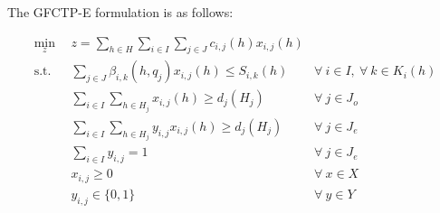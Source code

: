 
The GFCTP-E formulation is as follows:

\begin{subequations}\label{eqs:GFCTP-E}
  \begin{align}
    \min_{z} \:\: & 
    z = \sum_{h \in H}\sum_{i \in I}\sum_{j \in J}c_{i,j}(h) x_{i,j}(h) 
    & \label{eq:GRCTP-E_obj} \\
    \text{s.t.} \:\: &
    \sum_{j \in J}\beta_{i,k}(h,q_{j}) x_{i,j}(h) \leq S_{i,k}(h) 
    & 
    \forall \: i \in I, \: \forall \: k \in K_{i}(h) \label{eq:GRCTP-E_sup} \\
    &
    \sum_{i \in I}\sum_{h \in H_{j}} x_{i,j}(h) \geq d_{j}(H_{j}) 
    & 
    \forall \: j \in J_{o} \label{eq:GRCTP-E_dem} \\
    &
    \sum_{i \in I}\sum_{h \in H_{j}} y_{i,j} x_{i,j}(h) \geq d_{j}(H_{j}) 
    &
    \forall \: j \in J_{e} \label{eq:GRCTP-E_dem_e} \\
    &
    \sum_{i \in I} y_{i,j} = 1
    &
    \forall \: j \in J_{e} \label{eq:GRCTP-E_sumy} \\
    &
    x_{i,j} \geq 0
    &
    \forall \: x \in X \label{eq:GRCTP-E_x} \\
    &
    y_{i,j} \in \{0,1\}
    &
    \forall \: y \in Y \label{eq:GRCTP-E_y}
  \end{align}
\end{subequations}
